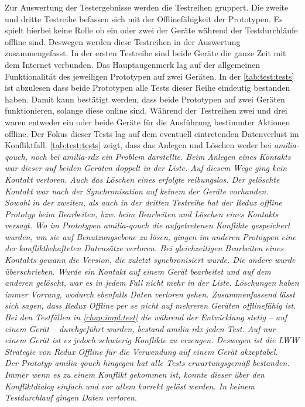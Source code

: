 Zur Auswertung der Testergebnisse werden die Testreihen gruppert.
Die zweite und dritte Testreihe befassen sich mit der Offlinefähigkeit der Prototypen.
Es spielt hierbei keine Rolle ob ein oder zwei der Geräte während der Testdurchläufe offline sind. Deswegen werden diese Testreihen in der Auswertung zusammengefasst.
%
%
%
In der ersten Testreihe sind beide Geräte die ganze Zeit mit dem Internet verbunden.
Das Hauptaugenmerk lag auf der allgemeinen Funktionalität des jeweiligen Prototypen auf zwei Geräten.
In der \autoref{tab:test:tests} ist abzulesen dass beide Prototypen alle Tests dieser Reihe eindeutig bestanden haben.
Damit kann bestätigt werden, dass beide Prototypen auf zwei Geräten funktionieren, solange diese online sind.
%
%
%
Während der Testreihen zwei und drei waren entweder ein oder beide Geräte für die Ausführung bestimmter Aktionen offline.
Der Fokus dieser Tests lag auf dem eventuell eintretenden Datenverlust im Konfliktfall.
\autoref{tab:test:tests} zeigt, dass das Anlegen und Löschen weder bei \it{amilia-qouch}, noch bei \it{amilia-rdx} ein Problem darstellte.
Beim Anlegen eines Kontakts war dieser auf beiden Geräten doppelt in der Liste. Auf diesem Wege ging kein Kontakt verloren.
Auch das Löschen eines erfolgte reibungslos. Der gelöschte Kontakt war nach der Synchronisation auf keinem der Geräte vorhanden.\\
Sowohl in der zweiten, als auch in der dritten Testreihe hat der Redux offline Prototyp beim Bearbeiten, bzw. beim Bearbeiten und Löschen eines Kontakts versagt.
Wo im Prototypen \it{amilia-qouch} die aufgetretenen Konflikte gespeichert wurden, um sie auf Benutzungsebene zu lösen, gingen im anderen Protoypen eine der konfliktbehafteten Datensätze verloren.
Bei gleichzeitigen Bearbeiten eines Kontakts gewann die Version, die zuletzt synchronisiert wurde. Die andere wurde überschrieben.
Wurde ein Kontakt auf einem Gerät bearbeitet und auf dem anderen gelöscht, war es in jedem Fall nicht mehr in der Liste. Löschungen haben immer Vorrang, wodurch ebenfalls Daten verloren gehen.
% 
%
Zusammenfassend lässt sich sagen, dass Redux Offline per se nicht auf mehreren Geräten offlinefähig ist.
Bei den Testfällen in \autoref{chap:impl:test} die während der Entwicklung stetig -- auf einem Gerät -- durchgeführt wurden, bestand \it{amilia-rdx} jeden Test.
Auf nur einem Gerät ist es jedoch schwierig Konflikte zu erzeugen. Deswegen ist die \gls{LWW} Strategie von Redux Offline für die Verwendung auf einem Gerät akzeptabel.\\
Der Prototyp \it{amilia-qouch} hingegen hat alle Tests erwartungsgemäß bestanden.
Immer wenn es zu einem Konflikt gekommen ist, konnte dieser über den Konfliktdialog einfach und vor allem korrekt gelöst werden.
In keinem Testdurchlauf gingen Daten verloren.
%